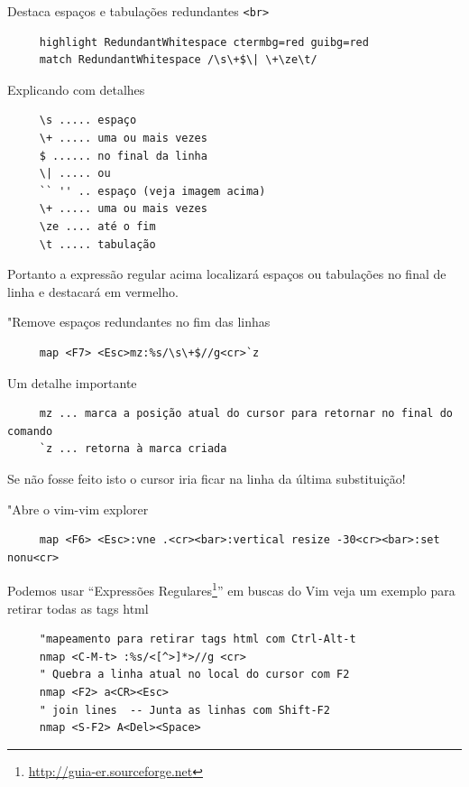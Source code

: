 \documentclass[10pt,a4paper,openany]{book}
\begin{document}
Destaca espaços e tabulações redundantes {\tt <br>}

\begin{verbatim}
     highlight RedundantWhitespace ctermbg=red guibg=red
     match RedundantWhitespace /\s\+$\| \+\ze\t/
\end{verbatim}

Explicando com detalhes

\begin{verbatim}
     \s ..... espaço
     \+ ..... uma ou mais vezes
     $ ...... no final da linha
     \| ..... ou
     `` '' .. espaço (veja imagem acima)
     \+ ..... uma ou mais vezes
     \ze .... até o fim
     \t ..... tabulação
\end{verbatim}

Portanto a expressão regular acima localizará espaços ou tabulações no final de linha
e destacará em vermelho.

"Remove espaços redundantes no fim das linhas

\begin{verbatim}
     map <F7> <Esc>mz:%s/\s\+$//g<cr>`z
\end{verbatim}

Um detalhe importante

\begin{verbatim}
     mz ... marca a posição atual do cursor para retornar no final do comando
     `z ... retorna à marca criada
\end{verbatim}

Se não fosse feito isto o cursor iria ficar na linha da última substituição!

"Abre o vim-vim explorer

\begin{verbatim}
     map <F6> <Esc>:vne .<cr><bar>:vertical resize -30<cr><bar>:set nonu<cr>
\end{verbatim}

Podemos usar ``Expressões Regulares\footnote{\url{http://guia-er.sourceforge.net}}'' em
buscas do Vim veja um exemplo para retirar todas as tags html

\begin{verbatim}
     "mapeamento para retirar tags html com Ctrl-Alt-t
     nmap <C-M-t> :%s/<[^>]*>//g <cr>
     " Quebra a linha atual no local do cursor com F2
     nmap <F2> a<CR><Esc>
     " join lines  -- Junta as linhas com Shift-F2
     nmap <S-F2> A<Del><Space>
\end{verbatim}
\end{document}
